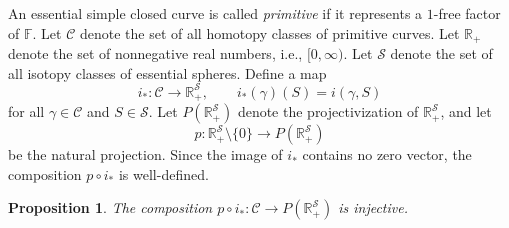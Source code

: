 \documentclass[12pt,a4paper]{amsart}
\numberwithin{equation}{section}
\newcommand{\FF}{\mathbb{F}}
\theoremstyle{plain}
\newtheorem{proposition}[theorem]{Proposition}
\theoremstyle{definition}
\theoremstyle{remark}
\begin{document}


An essential simple closed curve is called \emph{primitive} if it represents a \(1\)-free factor of \(\mathbb{F}\).  
Let \(\mathcal{C}\) denote the set of all homotopy classes of primitive curves.  
Let \(\mathbb{R}_+\) denote the set of nonnegative real numbers, i.e., \([0,\infty)\).  
Let $\mathcal{S}$ denote the set of all isotopy classes of essential spheres.
Define a map  
\[
i_* : \mathcal{C} \to \mathbb{R}_+^{\mathcal{S}}, \qquad
i_*(\gamma)(S) = i(\gamma, S)
\]
for all \(\gamma \in \mathcal{C}\) and \(S \in \mathcal{S}\).  
Let \(P(\mathbb{R}_+^{\mathcal{S}})\) denote the projectivization of \(\mathbb{R}_+^{\mathcal{S}}\), and let  
\[
p : \mathbb{R}_+^{\mathcal{S}} \setminus \{0\} \to P(\mathbb{R}_+^{\mathcal{S}})
\]
be the natural projection.  
Since the image of \(i_*\) contains no zero vector, the composition \(p \circ i_*\) is well-defined.


\begin{proposition} \label{prop:conti}
    The composition $p \circ i_* : \mathcal{C} \to P(\mathbb{R}_+^\mathcal{S})$ is injective.
\end{proposition}
\end{document}
